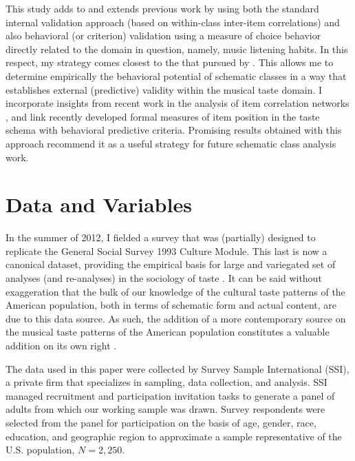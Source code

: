 \documentclass[preprint, authoryear,11pt, 3p]{elsarticle}
\begin{document}
This study adds to and extends previous work by using both the standard internal validation approach (based on within-class inter-item correlations) and also behavioral (or criterion) validation using a measure of choice behavior directly related to the domain in question, namely, music listening habits. In this respect, my strategy comes closest to the that pursued by \citet{baldassarri2014neither}. This allows me to determine empirically the behavioral potential of schematic classes in a way that establishes external (predictive) validity within the musical taste domain. I incorporate insights from recent work in the analysis of item correlation networks \citep{epskamp2012qgraph}, and link recently developed formal measures of item position in the taste schema with behavioral predictive criteria. Promising results obtained with this approach recommend it as a useful strategy for future schematic class analysis work. 

\section{Data and Variables}
In the summer of 2012, I fielded a survey that was (partially) designed to replicate the General Social Survey 1993 Culture Module. This last is now a canonical dataset, providing the empirical basis for large and variegated set of analyses (and re-analyses) in the sociology of taste \citep[][among others]{boutyline2017improving, bryson1996anything,bryson1997univores, goldberg2011mapping, han2003unraveling, okada2017structure, tampubolon2008revisiting}. It can be said without exaggeration that the bulk of our knowledge of the cultural taste patterns of the American population, both in terms of schematic form and actual content, are due to this data source. As such, the addition of a more contemporary source on the musical taste patterns of the American population constitutes a valuable addition on its own right \citep{lizardo2016cultural, lizardo2016end, lizardo2015musical}.

The data used in this paper were collected by Survey Sample International (SSI), a private firm that specializes in sampling, data collection, and analysis. SSI managed recruitment and participation invitation tasks to generate a panel of adults from which our working sample was drawn. Survey respondents were selected from the panel for participation on the basis of age, gender, race, education, and geographic region to approximate a sample representative of the U.S. population, $N = 2,250$.
\end{document}
